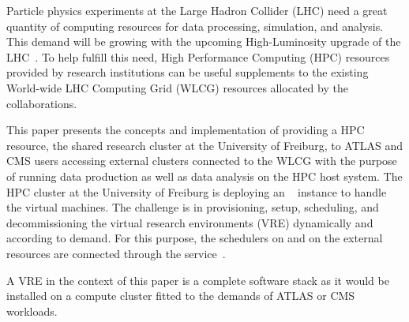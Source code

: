 
Particle physics experiments at the Large Hadron Collider (LHC) need a
great quantity of computing resources for data processing, simulation, and analysis.
This demand will be growing with the upcoming High-Luminosity upgrade of the LHC~\cite{HLLHCcompneeds}.
To help fulfill this need, High Performance Computing (HPC) resources provided by research institutions
can be useful supplements to the existing World-wide LHC Computing
Grid (WLCG) resources
allocated by the collaborations.


This paper presents the concepts and implementation of providing a HPC resource, the
shared research cluster \NEMO at the University of Freiburg, to ATLAS and CMS users accessing external clusters connected to the WLCG with the purpose of running data production as well as
data analysis on the HPC host system. The HPC cluster \NEMO at
the University of Freiburg is deploying an \Openstack~\cite{Openstack} instance to handle the
virtual machines. The challenge is in provisioning, setup, scheduling, and decommissioning the virtual research environments (VRE) dynamically and according to demand. For this purpose, the schedulers on \NEMO and on the external resources are
connected through the \Roced service~\cite{ROCED}.

A VRE in the context of this paper is a complete software stack
as it would be installed on a compute cluster fitted to the demands of ATLAS or CMS workloads.


